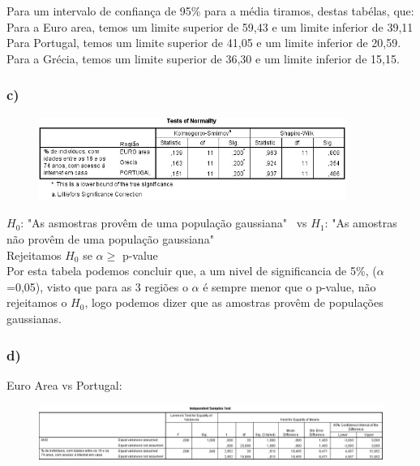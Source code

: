 \documentclass[a4paper,11pt]{article}
\begin{document}
\noindent Para um intervalo de confiança de 95\% para a média tiramos, destas tabélas, que:\\
Para a Euro area, temos um limite superior de 59,43 e um limite inferior de 39,11\\
Para Portugal, temos um limite superior de 41,05 e um limite inferior de 20,59.\\
Para a Grécia, temos um limite superior de 36,30 e um limite inferior de 15,15.\\

\newpage
\subsubsection{c)}

\begin{figure}[ht!]
\centering
\includegraphics[width=100mm]{p-value}
\label{overflow}
\end{figure}
\noindent $H_{0}$: "As asmostras provêm de uma população gaussiana"  \ vs $H_{1}$: "As amostras não provêm de uma população gaussiana"\\

\noindent Rejeitamos $H_{0}$ se $\alpha \geq$ p-value\\

\noindent Por esta tabela podemos concluir que, a um nivel de significancia de 5\%, ($\alpha$=0,05), visto que para as 3 regiões o $\alpha$ é sempre menor que o p-value, não rejeitamos o $H_{0}$, logo podemos dizer que as amostras provêm de populações gaussianas.
\newline

\subsubsection{d)}
Euro Area vs Portugal:
\begin{figure}[ht!]
\centering
\includegraphics[width=130mm]{EUareaVsPT}
\label{overflow}
\end{figure}
\end{document}
